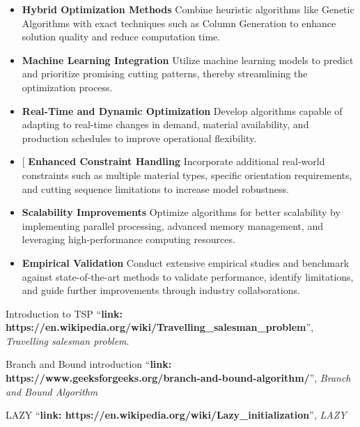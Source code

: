 \documentclass[a4paper]{article}
\begin{document}
\begin{itemize}

    \item \textbf{Hybrid Optimization Methods} Combine heuristic algorithms like Genetic Algorithms with exact techniques such as Column Generation to enhance solution quality and reduce computation time.
    
    \item \textbf{Machine Learning Integration} Utilize machine learning models to predict and prioritize promising cutting patterns, thereby streamlining the optimization process.
    
    \item \textbf{Real-Time and Dynamic Optimization} Develop algorithms capable of adapting to real-time changes in demand, material availability, and production schedules to improve operational flexibility.
    
    \item[ \textbf{Enhanced Constraint Handling} Incorporate additional real-world constraints such as multiple material types, specific orientation requirements, and cutting sequence limitations to increase model robustness.
    
    \item \textbf{Scalability Improvements} Optimize algorithms for better scalability by implementing parallel processing, advanced memory management, and leveraging high-performance computing resources.

    
    \item \textbf{Empirical Validation} Conduct extensive empirical studies and benchmark against state-of-the-art methods to validate performance, identify limitations, and guide further improvements through industry collaborations.

\end{itemize}
\begin{thebibliography}{80}

Introduction to TSP
``\textbf{link: https://en.wikipedia.org/wiki/Travelling\_salesman\_problem}'',
\textit{Travelling salesman problem}.

Branch and Bound introduction
``\textbf{link: https://www.geeksforgeeks.org/branch-and-bound-algorithm/}'', \textit{Branch and Bound Algorithm}

LAZY
``\textbf{link: https://en.wikipedia.org/wiki/Lazy_initialization}'', \textit{LAZY}


\end{thebibliography}
\end{document}
